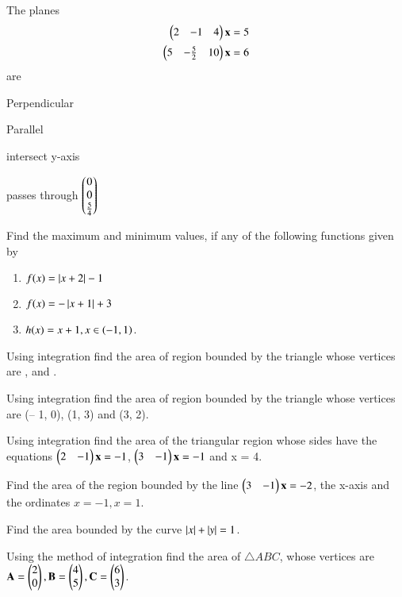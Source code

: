 \item The planes 
%
\begin{align}
\begin{pmatrix}2 & -1 & 4\end{pmatrix}\mathbf{x}&=5
\\
\begin{pmatrix}5 & -\frac{5}{2} & 10\end{pmatrix}\mathbf{x}&=6
\end{align}
%
are 
%
\begin{enumerate}[itemsep=2pt]
\begin{multicols}{2}
\item Perpendicular
\item Parallel
\item intersect y-axis
\item passes through $\begin{pmatrix}0\\0\\\frac{5}{4}\end{pmatrix}$
\end{multicols}
\end{enumerate}
%
\item Find the maximum and minimum values, if any of
the following functions given by 
%
\begin{enumerate}
\item $f(x) = \left\vert x+2\right\vert-1$
\item $f(x) = -\left\vert x+1\right\vert+3$
\item $h(x) = x+1, x \in \left(-1,1\right)$.
\end{enumerate}
%
\item Using integration find the area of region bounded by the triangle whose vertices are ,  and .
%
\item  Using integration find the area of region bounded by the triangle whose vertices are (– 1, 0), (1, 3) and (3, 2).
\item  Using integration find the area of the triangular region whose sides have the equations $\begin{pmatrix}2 & -1 \end{pmatrix}\mathbf{x} = -1$, $\begin{pmatrix}3 & -1 \end{pmatrix}\mathbf{x} = -1$ and x = 4.
%
\item Find the area of the region bounded by the line $\begin{pmatrix}3 & -1\end{pmatrix}\mathbf{x} = -2$, the x-axis and the ordinates $x = -1, x = 1$.
\item Find the area bounded by the curve $\left\vert x\right\vert+\left\vert y\right\vert = 1$.
\item Using the method of integration find the area of $\triangle ABC$, whose vertices are $\mathbf{A} = \begin{pmatrix} 2\\0 \end{pmatrix}, \mathbf{B} = \begin{pmatrix} 4\\5 \end{pmatrix}, \mathbf{C} = \begin{pmatrix} 6\\3 \end{pmatrix}$.
